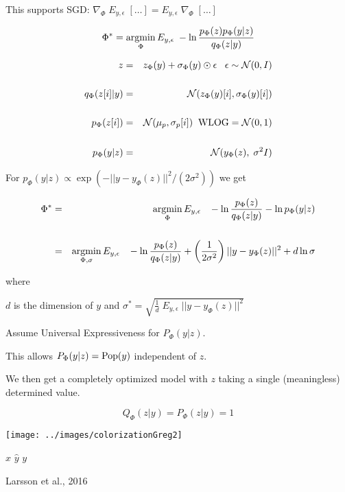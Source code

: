 {\vfill
This supports SGD: $\nabla_\Phi \;E_{y,\epsilon}\; [\ldots] = E_{y,\epsilon}\; \nabla_\Phi\;[\ldots]$

$$\Phi^* = \operatorname*{argmin}_\Phi E_{y,\epsilon}\;-\ln \frac{p_\Phi(z)p_\Phi(y|z)}{q_\Phi(z|y)}$$

{\color{red}
\begin{eqnarray*}
z & = & z_\Phi(y) + \sigma_\Phi(y) \odot \epsilon\;\;\;\epsilon \sim {\cal N}(0,I) \\
\\
q_\Phi(z[i]|y) & = & {\cal N}(z_\Phi(y)[i],\sigma_\Phi(y)[i]) \\
\\
p_\Phi(z[i]) & = & {\cal N}(\mu_p,\sigma_p[i]) \;\;\mbox{WLOG} = {\cal N}(0,1) \\
\\
p_\Phi(y|z) & = & {\cal N}(y_\Phi(z),\;\sigma^2I)
\end{eqnarray*}
}


For $p_\Phi(y|z) \propto \exp(-||y - y_\Phi(z)||^2/(2\sigma^2))$ we get

\begin{eqnarray*}
\Phi^* & = & \operatorname*{argmin}_{\Phi} E_{y,\epsilon}\;\;\;-\ln \frac{p_\Phi(z)}{q_\Phi(z|y)} - \ln p_\Phi(y|z) \\
\\
       & = & \operatorname*{argmin}_{\Phi,\sigma} E_{y,\epsilon}\;\;\;-\ln \frac{p_\Phi(z)}{q_\Phi(z|y)} +\left(\frac{1}{2\sigma^2}\right)||y - y_\Phi(z)||^2 + d\ln \sigma
\end{eqnarray*}

\vfill
where

\centerline{$d$ is the dimension of $y$ and $\sigma^*  =  \sqrt{\frac{1}{d}\;E_{y,\epsilon}\; ||y - y_\Phi(z)||^2}$}


Assume Universal Expressiveness for $P_\Phi(y|z)$.

\vfill
This allows $P_\Phi(y|z) = \mathrm{Pop}(y)$ independent of $z$.

\vfill
We then get a completely optimized model with $z$ taking a single (meaningless) determined value.

\vfill
$$Q_\Phi(z|y) = P_\Phi(z|y) = 1$$

\medskip
\centerline{\texttt{[image: ../images/colorizationGreg2]}}
\centerline{$x$ \hspace{4em} $\hat{y}$ \hspace{4em} $y$}
\centerline{\huge Larsson et al., 2016}

}
